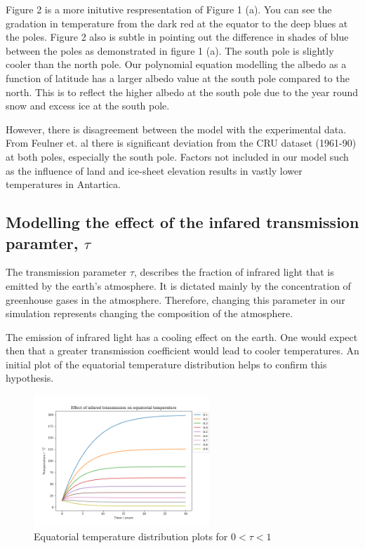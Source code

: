 \documentclass{article}%
\begin{document}
Figure 2 is a more initutive respresentation of Figure 1 (a). You can see the gradation in temperature from the dark red at the equator to the deep blues at the poles.
Figure 2 also is subtle in pointing out the difference in shades of blue between the poles as demonstrated in figure 1 (a). The south pole is slightly cooler than the north pole. 
Our polynomial equation modelling the albedo as a function of latitude has a larger albedo value at the south pole compared to the north. \cite{Lacis}
This is to reflect the higher albedo at the south pole due to the year round snow and excess ice at the south pole. \par
However, there is disagreement between the model with the experimental data. From Feulner et. al \cite{Feulner} there is significant deviation from the CRU dataset (1961-90) at both poles, especially the south pole.
Factors not included in our model such as the influence of land and ice-sheet elevation results in vastly lower temperatures in Antartica. \cite{Feulner} 

\subsection{Modelling the effect of the infared transmission paramter, $ \tau$ }
The transmission parameter $\tau$, describes the fraction of infrared light that is emitted by the earth's atmosphere. It is dictated mainly by the concentration of greenhouse
gases in the atmosphere. Therefore, changing this parameter in our simulation represents changing the composition of the atmosphere. \par
The emission of infrared light has a cooling effect on the earth. One would expect then that a greater transmission coefficient would lead to cooler temperatures.
An initial plot of the equatorial temperature distribution helps to confirm this hypothesis.

\begin{figure}[H]%
  \centering%
  \includegraphics[width=250px]{temperature-distributions-IR.png}
  \caption{Equatorial temperature distribution plots for $ 0 < \tau < 1$}
\end{figure}
\end{document}
